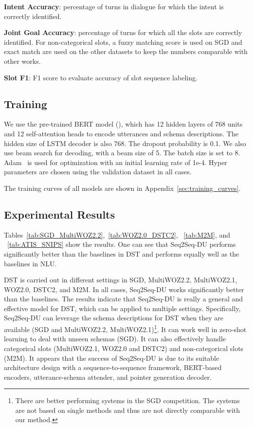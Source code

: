 \documentclass[11pt]{article}
\begin{document}
\noindent\textbf{Intent Accuracy}: percentage of turns in dialogue for which the intent is correctly identified.



\noindent\textbf{Joint Goal Accuracy}: 
percentage of turns for which all the slots are correctly identified. For non-categorical slots, a fuzzy matching score is used on SGD and exact match are used on the other datasets to keep the numbers comparable with other works.

\noindent\textbf{Slot F1}: 
F1 score to evaluate accuracy of slot sequence labeling.

\subsection{Training}
We use the pre-trained BERT model (), which has 12 hidden layers of 768 units and 12 self-attention heads to encode utterances and schema descriptions. The hidden size of LSTM decoder is also 768. The dropout probability is 0.1. We also use beam search for decoding, with a beam size of 5. The batch size is set to 8. Adam~\citep{kingma2014adam} is used for optimization with an initial learning rate of 1e-4. Hyper parameters are chosen using the validation dataset in all cases.

The training curves of all models are shown in Appendix~\ref{sec:training_curves}.

\subsection{Experimental Results}
Tables~\ref{tab:SGD_MultiWOZ2.2},~\ref{tab:WOZ2.0_DSTC2}, ~\ref{tab:M2M}, and ~\ref{tab:ATIS_SNIPS} show the results. One can see that Seq2Seq-DU performs significantly better than the baselines in DST and performs equally well as the baselines in NLU.

DST is carried out in different settings in SGD, MultiWOZ2.2, MultiWOZ2.1, WOZ2.0, DSTC2, and M2M. In all cases, Seq2Seq-DU works significantly better than the baselines. The results indicate that Seq2Seq-DU is really a general and effective model for DST, which can be applied to multiple settings. Specifically, Seq2Seq-DU can leverage the schema descriptions for DST when they are available (SGD and MultiWOZ2.2, MultiWOZ2.1)\footnote{There are better performing systems in the SGD competition. The systems are not based on single methods and thus are not directly comparable with our method.}. It can work well in zero-shot learning to deal with unseen schemas (SGD). It can also effectively handle categorical slots (MultiWOZ2.1, WOZ2.0 and DSTC2) and non-categorical slots (M2M). 
It appears that the success of Seq2Seq-DU is due to its suitable architecture design with a sequence-to-sequence framework, BERT-based encoders, utterance-schema attender, and pointer generation decoder.
\end{document}
